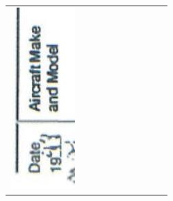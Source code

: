 \documentclass[10pt]{article}
\begin{document}
\begin{center}
\begin{tabular}{|c|c|c|c|c|c|c|c|c|c|}
\hline
\includegraphics[max width=\textwidth]{2025_02_27_dd68c3d38de88f0516d9g-070(2)}

\end{tabular}
\end{center}
\end{document}
